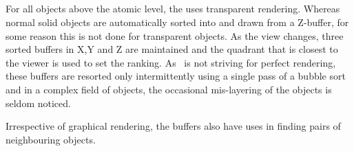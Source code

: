 \subsection{}

For all objects above the atomic level, the  uses transparent rendering.
Whereas normal solid objects are automatically sorted into and drawn from a Z-buffer,
for some reason this is not done for transparent objects.   As the view changes, 
three sorted buffers in X,Y and Z are maintained and the quadrant that is closest to
the viewer is used to set the ranking.  As \NAME\ is not striving for perfect rendering,
these buffers are resorted only intermittently using a single pass of a bubble sort and in
a complex field of objects, the occasional mis-layering of the objects is seldom noticed.

Irrespective of graphical rendering, the buffers also have uses in finding pairs of
neighbouring objects.
